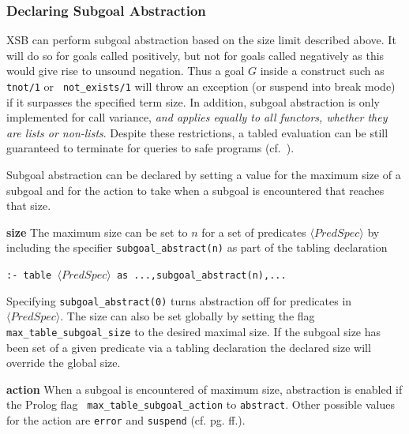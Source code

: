 \subsubsection{Declaring Subgoal Abstraction}
%

XSB can perform subgoal abstraction based on the size limit described
above.  It will do so for goals called positively, but not for goals
called negatively as this would give rise to unsound negation.  Thus a
goal $G$ inside a construct such as {\tt tnot/1} or {\tt
  not\_exists/1} will throw an exception (or suspend into break mode)
if it surpasses the specified term size. In addition, subgoal
abstraction is only implemented for call variance, {\em and applies
  equally to all functors, whether they are lists or non-lists}.
Despite these restrictions, a tabled evaluation can be still
guaranteed to terminate for queries to safe programs
(cf.~\cite{RigS13}).


Subgoal abstraction can be declared by setting a value for the maximum
size of a subgoal and for the action to take when a subgoal is
encountered that reaches that size.
%
\bi
\item {\bf size} The maximum size can be set to $n$ for a set of
  predicates $\langle PredSpec \rangle$ by including the specifier
  {\tt subgoal\_abstract(n)} as part of the tabling declaration

{\tt :- table $\langle PredSpec\rangle$  as ...,subgoal\_abstract(n),...}

  Specifying {\tt subgoal\_abstract(0)} turns abstraction off for
  predicates in $\langle PredSpec \rangle$.  The size can also be set
  globally by setting the flag {\tt max\_table\_subgoal\_size} to the
  desired maximal size.  If the subgoal size has been set of a given
  predicate via a tabling declaration the declared size will override
  the global size.

\item {\bf action} When a subgoal is encountered of maximum size,
  abstraction is enabled if the Prolog flag {\tt
    max\_table\_subgoal\_action} to {\tt abstract}.  Other possible
  values for the action are {\tt error} and {\tt suspend}
  (cf. pg. \pageref{prolog-flags} ff.).  \ei

